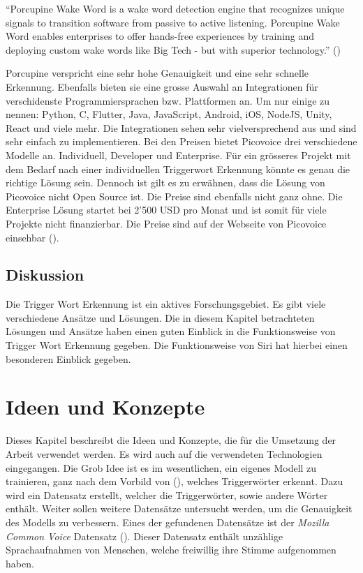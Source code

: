 \documentclass[11pt,a4paper]{article}
\begin{document}
\begin{displayquote}
	``Porcupine Wake Word is a wake word detection engine that recognizes unique signals to
	transition software from passive to active listening. Porcupine Wake Word enables enterprises
	to offer hands-free experiences by training and deploying custom wake words like Big Tech -
	but with superior technology.'' (\cite{picovoice2023porcupine})
\end{displayquote}

\noindent \newline
Porcupine verspricht eine sehr hohe Genauigkeit und eine sehr schnelle Erkennung. Ebenfalls bieten
sie eine grosse Auswahl an Integrationen für verschidenste Programmiersprachen bzw. Plattformen an.
Um nur einige zu nennen: Python, C, Flutter, Java, JavaScript, Android, iOS, NodeJS, Unity, React
und viele mehr. Die Integrationen sehen sehr vielversprechend aus und sind sehr einfach zu
implementieren. Bei den Preisen bietet Picovoice drei verschiedene Modelle an. Individuell,
Developer und Enterprise. Für ein grösseres Projekt mit dem Bedarf nach einer individuellen
Triggerwort Erkennung könnte es genau die richtige Lösung sein. Dennoch ist gilt es zu erwähnen,
dass die Lösung von Picovoice nicht Open Source ist. Die Preise sind ebenfalls nicht ganz ohne.
Die Enterprise Lösung startet bei 2'500 USD pro Monat und ist somit für viele Projekte nicht
finanzierbar. Die Preise sind auf der Webseite von Picovoice einsehbar
(\cite{picovoice2023porcupine}).



\subsection{Diskussion}
Die Trigger Wort Erkennung ist ein aktives Forschungsgebiet. Es gibt viele verschiedene Ansätze und
Lösungen. Die in diesem Kapitel betrachteten Lösungen und Ansätze haben einen guten Einblick in die
Funktionsweise von Trigger Wort Erkennung gegeben. Die Funktionsweise von Siri hat hierbei einen
besonderen Einblick gegeben.


\newpage \section{Ideen und Konzepte}
Dieses Kapitel beschreibt die Ideen und Konzepte, die für die Umsetzung der Arbeit verwendet
werden. Es wird auch auf die verwendeten Technologien eingegangen. Die Grob Idee ist es im 
wesentlichen, ein eigenes Modell zu trainieren, ganz nach dem Vorbild von (\cite{siri2017hey}), 
welches Triggerwörter erkennt. Dazu wird ein Datensatz erstellt, welcher die Triggerwörter, 
sowie andere Wörter enthält. Weiter sollen weitere Datensätze untersucht werden, um die 
Genauigkeit des Modells zu verbessern. Eines der gefundenen Datensätze ist der 
\textit{Mozilla Common Voice} Datensatz (\cite{ardila2020common}). Dieser Datensatz enthält 
unzählige Sprachaufnahmen von Menschen, welche freiwillig ihre Stimme aufgenommen haben. 
\end{document}
